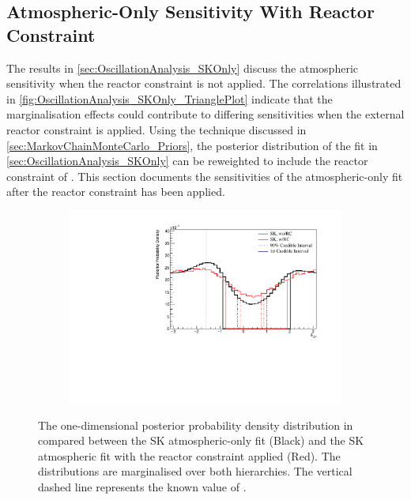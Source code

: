 \clearpage
\subsection{Atmospheric-Only Sensitivity With Reactor Constraint}
\label{sec:OscillationAnalysis_SKOnly_wRC}

The results in \autoref{sec:OscillationAnalysis_SKOnly} discuss the atmospheric sensitivity when the reactor constraint is not applied. The correlations illustrated in \autoref{fig:OscillationAnalysis_SKOnly_TrianglePlot} indicate that the marginalisation effects could contribute to differing sensitivities when the external reactor constraint is applied. Using the technique discussed in \autoref{sec:MarkovChainMonteCarlo_Priors}, the posterior distribution of the fit in \autoref{sec:OscillationAnalysis_SKOnly} can be reweighted to include the reactor constraint of  \cite{Particle_Data_Group2020-ms}. This section documents the sensitivities of the atmospheric-only fit after the reactor constraint has been applied.

\iffalse
\begin{figure}[h]
  \begin{subfigure}[t]{0.98\textwidth}
    \includegraphics[width=\textwidth, trim={0mm 0mm 0mm 0mm}, clip,page=1]{Figures/OA/SKOnlyFit_wRC/ContourComparison_1D_dcp_BH_2_wRC_woRC_UnSmeared_CredibleInterval.pdf}
  \end{subfigure}
  \caption{The one-dimensional posterior probability density distribution in  compared between the SK atmospheric-only fit (Black) and the SK atmospheric fit with the reactor constraint applied (Red). The distributions are marginalised over both hierarchies. The vertical dashed line represents the known value of .}
  \label{fig:OscillationAnalysis_SKOnly_DCP_WRC}
\end{figure}

